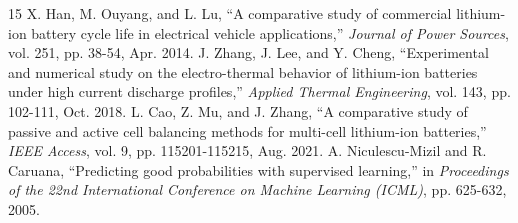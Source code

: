 \documentclass[conference]{IEEEtran}
\begin{document}
\begin{thebibliography}{15}
 X. Han, M. Ouyang, and L. Lu, ``A comparative study of commercial lithium-ion battery cycle life in electrical vehicle applications,'' \textit{Journal of Power Sources}, vol. 251, pp. 38-54, Apr. 2014.
 J. Zhang, J. Lee, and Y. Cheng, ``Experimental and numerical study on the electro-thermal behavior of lithium-ion batteries under high current discharge profiles,'' \textit{Applied Thermal Engineering}, vol. 143, pp. 102-111, Oct. 2018.
 L. Cao, Z. Mu, and J. Zhang, ``A comparative study of passive and active cell balancing methods for multi-cell lithium-ion batteries,'' \textit{IEEE Access}, vol. 9, pp. 115201-115215, Aug. 2021.
 A. Niculescu-Mizil and R. Caruana, ``Predicting good probabilities with supervised learning,'' in 
\textit{Proceedings of the 22nd International Conference on Machine Learning (ICML)}, pp. 625-632, 2005.
\end{thebibliography}
\end{document}
